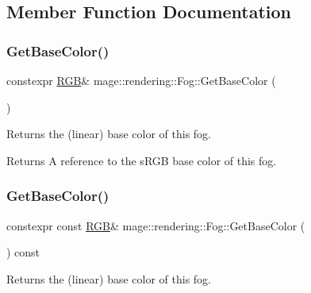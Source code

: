 \subsection{Member Function Documentation}
\mbox{\label{classmage_1_1rendering_1_1_fog_af2ba57f86df0f681ad6b67cba5fc8dc1}} 
\subsubsection{\texorpdfstring{Get\+Base\+Color()}{GetBaseColor()}\hspace{0.1cm}{\footnotesize\ttfamily [1/2]}}
{\footnotesize\ttfamily constexpr \mbox{\hyperlink{structmage_1_1_r_g_b}{R\+GB}}\& mage\+::rendering\+::\+Fog\+::\+Get\+Base\+Color (\begin{DoxyParamCaption}{ }\end{DoxyParamCaption})\hspace{0.3cm}{\ttfamily [noexcept]}}

Returns the (linear) base color of this fog.

\begin{DoxyReturn}{Returns}
A reference to the s\+R\+GB base color of this fog. 
\end{DoxyReturn}
\mbox{\label{classmage_1_1rendering_1_1_fog_a2a1441d2a0cdbc074260fa1af7fc656a}} 
\subsubsection{\texorpdfstring{Get\+Base\+Color()}{GetBaseColor()}\hspace{0.1cm}{\footnotesize\ttfamily [2/2]}}
{\footnotesize\ttfamily constexpr const \mbox{\hyperlink{structmage_1_1_r_g_b}{R\+GB}}\& mage\+::rendering\+::\+Fog\+::\+Get\+Base\+Color (\begin{DoxyParamCaption}{ }\end{DoxyParamCaption}) const\hspace{0.3cm}{\ttfamily [noexcept]}}

Returns the (linear) base color of this fog.

